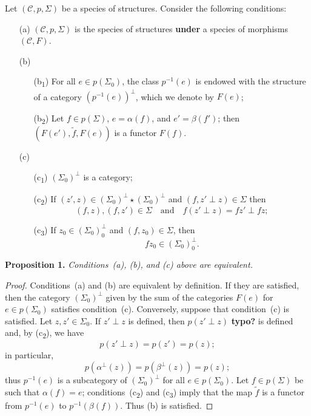 \documentclass[fleqn]{article}
\newenvironment{itenv}[1]
  {\phantomsection\par\medskip\noindent\textbf{#1.}\itshape}
  {\par\medskip}
\newcommand{\oldpage}[1]{\marginpar{\footnotesize$\Big\vert$ \textit{p.~#1}}}
\newcommand{\unsure}[1]{{\color{purple}\textbf{#1}}}
\newcommand{\CC}{\mathcal{C}}
\begin{document}
Let $(\CC,p,\Sigma)$ be a species of structures.
Consider the following conditions:
\begin{enumerate}
  \item[(a)]
    $(\CC,p,\Sigma)$ is the species of structures \unsure{under} a species of morphisms $(\CC,F)$.
  \oldpage{355}
  \item[(b)]
    \begin{enumerate}
      \item[(b\textsubscript{1})]
        For all $e\in p(\Sigma_0)$, the class $p^{-1}(e)$ is endowed with the structure of a category $(p^{-1}(e))^\perp$, which we denote by $F(e)$;
      \item[(b\textsubscript{2})]
        Let $f\in p(\Sigma)$, $e=\alpha(f)$, and $e'=\beta(f')$;
        then $(F(e'),\widetilde{f},F(e))$ is a functor $F(f)$.
    \end{enumerate}
  \item[(c)]
    \begin{enumerate}
      \item[(c\textsubscript{1})]
        $(\Sigma_0)^\perp$ is a category;
      \item[(c\textsubscript{2})]
        If $(z',z)\in(\Sigma_0)^\perp\star(\Sigma_0)^\perp$ and $(f,z'\perp z)\in\Sigma$ then
        \[
          (f,z),(f,z')\in\Sigma
          \quad\text{and}\quad
          f(z'\perp z)=fz'\perp fz;
        \]
      \item[(c\textsubscript{3})]
        If $z_0\in(\Sigma_0)_0^\perp$ and $(f,z_0)\in\Sigma$, then
        \[
          fz_0\in(\Sigma_0)_0^\perp.
        \]
    \end{enumerate}
\end{enumerate}

\begin{itenv}{Proposition 1}
\label{proposition:1}
  Conditions~(a), (b), and (c) above are equivalent.
\end{itenv}

\begin{proof}
  Conditions~(a) and (b) are equivalent by definition.
  If they are satisfied, then the category $(\Sigma_0)^\perp$ given by the sum of the categories $F(e)$ for $e\in p(\Sigma_0)$ satisfies condition~(c).
  Conversely, suppose that condition~(c) is satisfied.
  Let $z,z'\in\Sigma_0$.
  If $z'\perp z$ is defined, then $p(z'\perp z)$ \unsure{typo?} is defined and, by (c\textsubscript{2}), we have
  \[
    p(z'\perp z)
    = p(z')
    = p(z);
  \]
  in particular,
  \[
    p(\alpha^\perp(z))
    = p(\beta^\perp(z))
    = p(z);
  \]
  thus $p^{-1}(e)$ is a subcategory of $(\Sigma_0)^\perp$ for all $e\in p(\Sigma_0)$.
  Let $f\in p(\Sigma)$ be such that $\alpha(f)=e$;
  conditions~(c\textsubscript{2}) and (c\textsubscript{3}) imply that the map $\widetilde{f}$ is a functor from $p^{-1}(e)$ to $p^{-1}(\beta(f))$.
  Thus (b) is satisfied.
\end{proof}
\end{document}
